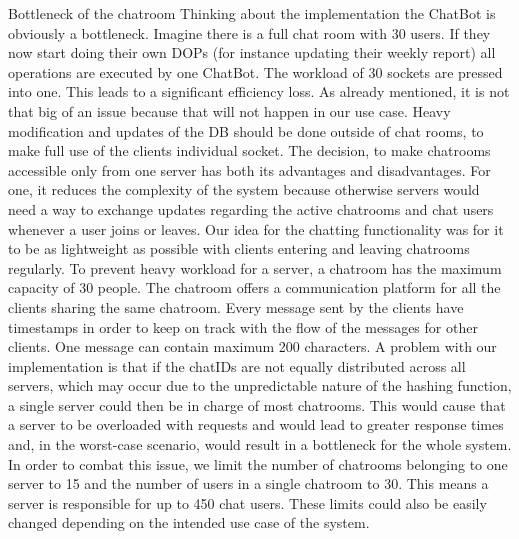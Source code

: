 Bottleneck of the chatroom
Thinking about the implementation the ChatBot is obviously a bottleneck. Imagine there is a full chat room with 30 users. If they now start doing their own DOPs (for instance updating their weekly report) all operations are executed by one ChatBot. The workload of 30 sockets are pressed into one. This leads to a significant efficiency loss.
As already mentioned, it is not that big of an issue because that will not happen in our use case. Heavy modification and updates of the DB should be done outside of chat rooms, to make full use of the clients individual socket.
The decision, to make chatrooms accessible only from one server has both its advantages and disadvantages. For one, it reduces the complexity of the system because otherwise servers would need a way to exchange updates regarding the active chatrooms and chat users whenever a user joins or leaves.
Our idea for the chatting functionality was for it to be as lightweight as possible with clients entering and leaving chatrooms regularly.
To prevent heavy workload for a server, a chatroom has the maximum capacity of 30 people. The chatroom offers a communication platform for all the clients sharing the same chatroom. Every message sent by the clients have timestamps in order to keep on track with the flow of the messages for other clients. One message can contain maximum 200 characters.
A problem with our implementation is that if the chatIDs are not equally distributed across all servers, which may occur due to the unpredictable nature of the hashing function, a single server could then be in charge of most chatrooms. This would cause that a server to be overloaded with requests and would lead to greater response times and, in the worst-case scenario, would result in a bottleneck for the whole system. In order to combat this issue, we limit the number of chatrooms belonging to one server to 15 and the number of users in a single chatroom to 30. This means a server is responsible for up to 450 chat users. These limits could also be easily changed depending on the intended use case of the system.
